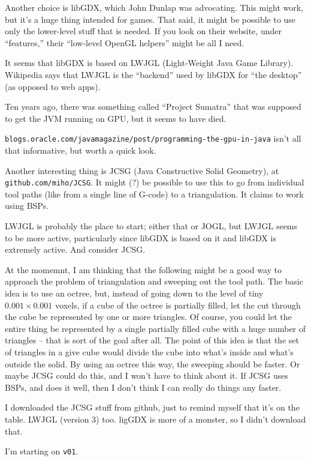 \documentclass{article}
\begin{document}
Another choice is libGDX, which John Dunlap was advocating. This might
work, but it's a huge thing intended for games. That said, it might be
possible to use only the lower-level stuff that is needed. If you look
on their website, under ``features,'' their ``low-level OpenGL
helpers'' might be all I need.

It seems that libGDX is based on LWJGL (Light-Weight Java Game
Library). Wikipedia says that LWJGL is the ``backend'' used by libGDX
for ``the desktop'' (as opposed to web apps).

Ten years ago, there was something
called ``Project Sumatra'' that was supposed to get the JVM running on
GPU, but it seems to have died.

\verb=blogs.oracle.com/javamagazine/post/programming-the-gpu-in-java=
isn't all that informative, but worth a quick look.

Another interesting thing is JCSG (Java Constructive Solid Geometry),
at \verb=github.com/miho/JCSG=. It might (?) be possible to use this
to go from individual tool paths (like from a single line of G-code)
to a triangulation. It claims to work using BSPs.

LWJGL is probably the place to start; either that or JOGL, but LWJGL
seems to be more active, particularly since libGDX is based on it and
libGDX is extremely active. And consider JCSG.

At the momemnt, I am thinking that the following might be a good way
to approach the problem of triangulation and sweeping out the tool
path. The basic idea is to use an octree, but, instead of going down
to the level of tiny $0.001\times 0.001$ voxels, if a cube of the
octree is partially filled, let the cut through the cube be
represented by one or more triangles. Of course, you could let the
entire thing be represented by a single partially filled cube with a
huge number of triangles -- that is sort of the goal after all. The
point of this idea is that the set of triangles in a give cube would
divide the cube into what's inside and what's outside the solid. By
using an octree this way, the sweeping should be faster. Or maybe
JCSG could do this, and I won't have to think about it. If JCSG uses
BSPs, and does it well, then I don't think I can really do things any
faster. 

I downloaded the JCSG stuff from github, just to remind myself that
it's on the table. LWJGL (version 3) too. ligGDX is more of a monster,
so I didn't download that.

I'm starting on {\tt v01}.
\end{document}
